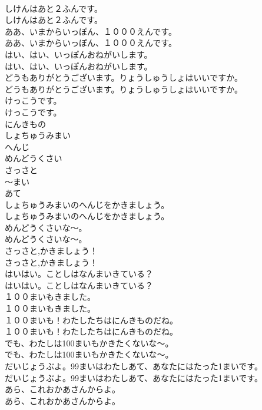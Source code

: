 \documentclass[8pt]{extreport}
\begin{document}
\begin{CJK}{UTF8}{min}
\\	しけんはあと２ふんです。	
\\	しけんはあと２ふんです。 
\\	ああ、いまからいっぽん、１０００えんです。	
\\	ああ、いまからいっぽん、１０００えんです。 
\\	はい、はい、いっぽんおねがいします。	
\\	はい、はい、いっぽんおねがいします。 
\\	どうもありがとうございます。りょうしゅうしょはいいですか。	
\\	どうもありがとうございます。りょうしゅうしょはいいですか。 
\\	けっこうです。	
\\	けっこうです。 
\\	にんきもの
\\	しょちゅうみまい
\\	へんじ
\\	めんどうくさい
\\	さっさと
\\	～まい
\\	あて
\\	しょちゅうみまいのへんじをかきましょう。	
\\	しょちゅうみまいのへんじをかきましょう。 
\\	めんどうくさいな〜。	
\\	めんどうくさいな〜。 
\\	さっさと,かきましょう！	
\\	さっさと,かきましょう！ 
\\	はいはい。ことしはなんまいきている？	
\\	はいはい。ことしはなんまいきている？ 
\\	１００まいもきました。	
\\	１００まいもきました。 
\\	１００まいも！わたしたちはにんきものだね。	
\\	１００まいも！わたしたちはにんきものだね。 
\\	でも、わたしは100まいもかきたくないな〜。	
\\	でも、わたしは100まいもかきたくないな〜。 
\\	だいじょうぶよ。99まいはわたしあて、あなたにはたった1まいです。	
\\	だいじょうぶよ。99まいはわたしあて、あなたにはたった1まいです。 
\\	あら、これおかあさんからよ。	
\\	あら、これおかあさんからよ。 

\end{CJK}
\end{document}
